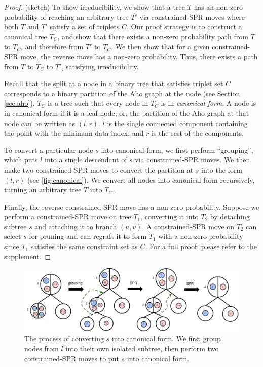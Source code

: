 \begin{proof}
(sketch) To show irreducibility,
we show that a tree $T$ has an non-zero
probability of reaching an arbitrary tree
$T'$ via constrained-SPR moves where
both $T$ and $T'$ satisfy a set of triplets $C$.
Our proof strategy
is to construct a canonical tree 
$T_C$, and show that there exists
a non-zero probability path from $T$ to $T_C$,
and therefore from $T'$ to $T_C$.
We then show that for a given constrained-SPR move,
the reverse move has a non-zero probability.
Thus, there exists a path from $T$ to $T_C$ to
$T'$, satisfying irreducibility.

Recall that the split at a node in a binary
tree that satisfies triplet set $C$
corresponds to a binary partition
of the Aho graph at the node (see Section \ref{sec:aho}).
$T_C$ is a tree such that
every node in $T_C$ is in \emph{canonical form}.
A node is in canonical form if it is a leaf node,
or, the partition of the Aho graph
at that node can be written as $(l, r)$.
$l$ is the single connected component
containing the point with the minimum data index,
and $r$ is the rest of the components.

To convert a particular node $s$ into canonical form,
we first perform ``grouping'',
which puts $l$ into a single descendant of $s$
via constrained-SPR moves.
We then make two constrained-SPR moves to convert
the partition at $s$ into the form $(l, r)$ (see \autoref{fig:canonical}).
We convert all nodes into canonical form recursively, turning 
an arbitrary tree $T$ into $T_C$.

Finally, the reverse constrained-SPR move has a non-zero
probability. Suppose
we perform a constrained-SPR move on tree $T_1$, converting it into $T_2$ by 
detaching subtree $s$
and attaching it to branch $(u, v)$.
A constrained-SPR move on $T_2$ can select
$s$ for pruning 
and can regraft it to form $T_1$ with a non-zero
probability since
$T_1$ satisfies the same constraint set as $C$.
For a full proof, please refer to the supplement.
\end{proof}

\begin{figure}
    \centering
    \includegraphics[width=\textwidth]{img/CanonicalTree}
    \caption{The process of converting $s$ into canonical form.
    We first group nodes from $l$ into their own isolated subtree, then perform
    two constrained-SPR moves to put $s$ into canonical form.}
    \label{fig:canonical}
\end{figure}

